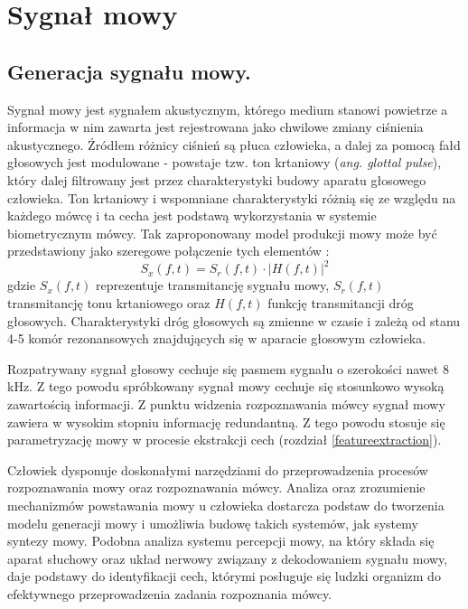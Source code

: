 \section{Sygnał mowy}

\subsection{Generacja sygnału mowy.}
\label{glottal}
Sygnał mowy jest sygnałem akustycznym, którego medium stanowi powietrze a informacja w nim zawarta jest rejestrowana jako chwilowe zmiany ciśnienia akustycznego. Źródłem różnicy ciśnień są płuca człowieka, a dalej za pomocą fałd głosowych jest modulowane - powstaje tzw. ton krtaniowy (\textit{ang. glottal pulse}), który dalej filtrowany jest przez charakterystyki budowy aparatu głosowego człowieka. Ton krtaniowy i wspomniane charakterystyki różnią się ze względu na każdego mówcę i ta cecha jest podstawą wykorzystania w systemie biometrycznym mówcy. Tak zaproponowany model produkcji mowy może być przedstawiony jako szeregowe połączenie tych elementów \cite{multidsp}:
\begin{equation}
  S_x(f,t) = S_r(f,t) \cdot |H(f,t)|^2
\end{equation}
gdzie $S_x(f,t)$ reprezentuje transmitancję sygnału mowy, $S_r(f,t)$ transmitancję tonu krtaniowego oraz $H(f,t)$ funkcję transmitancji dróg głosowych. Charakterystyki dróg głosowych są zmienne w czasie i zależą od stanu 4-5 komór rezonansowych znajdujących się w aparacie głosowym człowieka.

Rozpatrywany sygnał głosowy cechuje się pasmem sygnału o szerokości nawet 8 kHz. Z tego powodu spróbkowany sygnał mowy cechuje się stosunkowo wysoką zawartością informacji. Z punktu widzenia rozpoznawania mówcy sygnał mowy zawiera w wysokim stopniu informację redundantną. Z tego powodu stosuje się parametryzację mowy w procesie ekstrakcji cech (rozdział \ref{featureextraction}).

Człowiek dysponuje doskonałymi narzędziami do przeprowadzenia procesów rozpoznawania mowy oraz rozpoznawania mówcy. Analiza oraz zrozumienie mechanizmów powstawania mowy u człowieka dostarcza podstaw do tworzenia modelu generacji mowy i umożliwia budowę takich systemów, jak systemy syntezy mowy. Podobna analiza systemu percepcji mowy, na który składa się aparat słuchowy oraz układ nerwowy związany z dekodowaniem sygnału mowy, daje podstawy do identyfikacji cech, którymi posługuje się ludzki organizm do efektywnego przeprowadzenia zadania rozpoznania mówcy.

